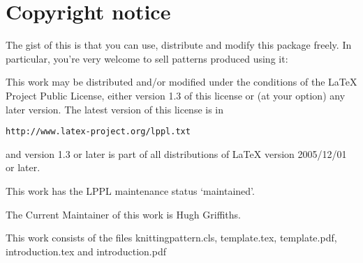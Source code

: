 \documentclass{article}
\begin{document}
\section*{Copyright notice}

The gist of this is that you can use, distribute and modify this
package freely.  In particular, you're very welcome to sell patterns
produced using it:

This work may be distributed and/or modified under the conditions of
the LaTeX Project Public License, either version 1.3 of this license
or (at your option) any later version.  The latest version of this
license is in 
\begin{verbatim}
http://www.latex-project.org/lppl.txt
\end{verbatim}
and version 1.3 or later is part of all distributions of LaTeX version
2005/12/01 or later.

This work has the LPPL maintenance status `maintained'.
 
The Current Maintainer of this work is Hugh Griffiths.

This work consists of the files knittingpattern.cls, template.tex,
template.pdf, introduction.tex and introduction.pdf
\end{document}
